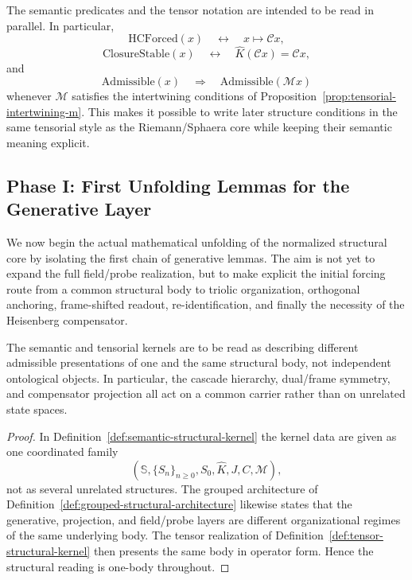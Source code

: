 \begin{remark}
\label{rem:semantic-tensor-correspondence}
The semantic predicates and the tensor notation are intended to be read in
parallel. In particular,
\[
\mathrm{HCForced}(x)
\quad\leftrightarrow\quad
x\mapsto \mathcal Cx,
\]
\[
\mathrm{ClosureStable}(x)
\quad\leftrightarrow\quad
\hat K(\mathcal Cx)=\mathcal Cx,
\]
and
\[
\mathrm{Admissible}(x)
\quad\Rightarrow\quad
\mathrm{Admissible}(\mathcal Mx)
\]
whenever $\mathcal M$ satisfies the intertwining conditions of
Proposition~\ref{prop:tensorial-intertwining-m}. This makes it possible to
write later structure conditions in the same tensorial style as the
Riemann/Sphaera core while keeping their semantic meaning explicit.
\end{remark}


\subsection*{Phase I: First Unfolding Lemmas for the Generative Layer}

We now begin the actual mathematical unfolding of the normalized structural
core by isolating the first chain of generative lemmas. The aim is not yet to
expand the full field/probe realization, but to make explicit the initial
forcing route from a common structural body to triolic organization,
orthogonal anchoring, frame-shifted readout, re-identification, and finally the
necessity of the Heisenberg compensator.

\begin{lemma}
\label{lem:one-body-lemma}
The semantic and tensorial kernels are to be read as describing different
admissible presentations of one and the same structural body, not independent
ontological objects. In particular, the cascade hierarchy, dual/frame symmetry,
and compensator projection all act on a common carrier rather than on unrelated
state spaces.
\end{lemma}

\begin{proof}
In Definition~\ref{def:semantic-structural-kernel} the kernel data are given as
one coordinated family
\[
(\mathbb S,\{S_n\}_{n\ge 0},S_0,\hat K,J,C,\mathcal M),
\]
not as several unrelated structures. The grouped architecture of
Definition~\ref{def:grouped-structural-architecture} likewise states that the
generative, projection, and field/probe layers are different organizational
regimes of the same underlying body. The tensor realization of
Definition~\ref{def:tensor-structural-kernel} then presents the same body in
operator form. Hence the structural reading is one-body throughout.
\end{proof}

